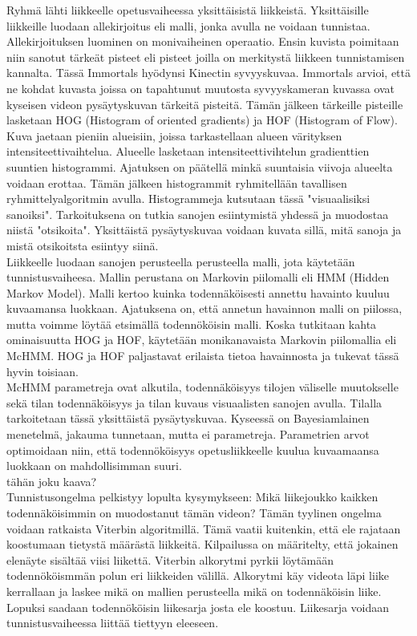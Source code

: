 Ryhmä lähti liikkeelle opetusvaiheessa yksittäisistä liikkeistä. Yksittäisille liikkeille luodaan allekirjoitus eli malli,
jonka avulla ne voidaan tunnistaa. Allekirjoituksen luominen on monivaiheinen operaatio. Ensin kuvista poimitaan niin sanotut
tärkeät pisteet eli pisteet joilla on merkitystä liikkeen tunnistamisen kannalta. Tässä Immortals hyödynsi Kinectin syvyyskuvaa.
Immortals arvioi, että ne kohdat kuvasta joissa on tapahtunut muutosta syvyyskameran kuvassa ovat kyseisen videon pysäytyskuvan
tärkeitä pisteitä. Tämän jälkeen tärkeille pisteille lasketaan HOG (Histogram of oriented gradients) ja HOF (Histogram of Flow). 
Kuva jaetaan pieniin alueisiin, joissa tarkastellaan alueen värityksen intensiteettivaihtelua.
Alueelle lasketaan intensiteettivihtelun gradienttien suuntien histogrammi. Ajatuksen on päätellä minkä suuntaisia 
viivoja alueelta voidaan erottaa. Tämän jälkeen histogrammit ryhmitellään tavallisen ryhmittelyalgoritmin avulla.
Histogrammeja kutsutaan tässä "visuaalisiksi sanoiksi". Tarkoituksena on tutkia sanojen esiintymistä yhdessä ja muodostaa niistä "otsikoita". 
Yksittäistä pysäytyskuvaa voidaan kuvata sillä, mitä sanoja ja mistä otsikoitsta esiintyy siinä.\\

Liikkeelle luodaan sanojen perusteella perusteella malli, jota käytetään tunnistusvaiheesa. Mallin perustana on Markovin piilomalli 
eli HMM (Hidden Markov Model). Malli kertoo kuinka todennäköisesti annettu havainto kuuluu kuvaamansa luokkaan. 
Ajatuksena on, että annetun havainnon malli on piilossa, mutta voimme löytää etsimällä todennököisin malli.
Koska tutkitaan kahta ominaisuutta HOG ja HOF, käytetään monikanavaista Markovin piilomallia eli McHMM. 
HOG ja HOF paljastavat erilaista tietoa havainnosta ja tukevat tässä hyvin toisiaan.\\

McHMM parametreja ovat alkutila, todennäköisyys tilojen väliselle muutokselle sekä tilan todennäköisyys ja tilan kuvaus visuaalisten sanojen avulla. 
Tilalla tarkoitetaan tässä yksittäistä pysäytyskuvaa. Kyseessä on Bayesiamlainen menetelmä, jakauma tunnetaan, mutta ei parametreja.
Parametrien arvot optimoidaan niin, että todennököisyys opetusliikkeelle kuulua kuvaamaansa luokkaan on mahdollisimman suuri.\\
tähän joku kaava? \\

Tunnistusongelma pelkistyy lopulta kysymykseen: Mikä liikejoukko kaikken todennäköisimmin on muodostanut tämän videon?
Tämän tyylinen ongelma voidaan ratkaista Viterbin algoritmillä. Tämä vaatii kuitenkin, että ele rajataan koostumaan tietystä määrästä liikkeitä.
Kilpailussa on määritelty, että jokainen elenäyte sisältää viisi liikettä.
Viterbin alkorytmi pyrkii löytämään todennököismmän polun eri liikkeiden välillä. Alkorytmi käy videota läpi liike kerrallaan ja laskee mikä
on mallien perusteella mikä on todennäköisin liike. Lopuksi saadaan todennököisin liikesarja josta ele koostuu.
Liikesarja voidaan tunnistusvaiheessa liittää tiettyyn eleeseen. \citep {6239185}\\ 


